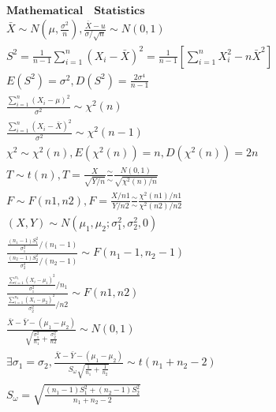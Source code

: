 \documentclass{article}
\begin{document}
\clearpage

\begin{align*}
    \mathbf{Mathematical \quad Statistics} \\ 
    \bar{X} \sim N(\mu,\frac{\sigma^2}{n}), \frac{\bar{X}-u}{\sigma/\sqrt{n}} \sim N(0,1)\\ 
    S^2 = \frac{1}{n-1}\sum_{i=1}^n(X_{i}-\bar{X})^2 = \frac{1}{n-1}[\sum_{i=1}^nX_{i}^2 - n \bar{X}^2] \\ 
    E(S^2) = \sigma^2, D(S^2) = \frac{2\sigma^4}{n-1} \\ 
    \frac{\sum_{i=1}^n(X_{i}-\mu)^2}{\sigma^2} \sim \chi^2(n) \\ 
    \frac{\sum_{i=1}^n(X_{i}-\bar{X})^2}{\sigma^2} \sim \chi^2(n-1) \\ 
    \chi^2 \sim \chi^2(n), E(\chi^2(n)) = n, D(\chi^2(n)) = 2n \\ 
    T \sim t(n), T = \frac{X}{\sqrt{Y/n}} \frac{\sim}{\sim} \frac{N(0,1)}{\sqrt{\chi^2(n)/n}}\\
    F \sim F(n1,n2), F = \frac{X/n1}{Y/n2} \frac{\sim}{\sim} \frac{\chi^2(n1)/n1}{\chi^2(n2)/n2} \\ 
    (X,Y) \sim N(\mu_{1},\mu_{2};\sigma_{1}^2,\sigma_{2}^2,0) \\ 
    \frac{\frac{(n_{1}-1)S_{1}^2}{\sigma_{1}^2}/(n_{1}-1)}{\frac{(n_{2}-1)S_{2}^2}{\sigma_{2}^2}/(n_{2}-1)} \sim F(n_{1}-1,n_{2}-1) \\
    \frac{\frac{\sum_{i=1}^{n_{1}}(X_{i}-\mu_{1})^2}{\sigma_{1}^2}/n_{1}}{\frac{\sum_{i=1}^{n_{2}}(X_{i}-\mu_{2})^2}{\sigma_{2}^2}/n2} \sim F(n1,n2) \\  
    \frac{\bar{X}-\bar{Y}-(\mu_{1}-\mu_{2})}{\sqrt{\frac{\sigma_{1}^2}{n_{1}}+\frac{\sigma_{2}^2}{n2}}} \sim N(0,1) \\ 
    \exists \sigma_{1} = \sigma_{2}, \frac{\bar{X}-\bar{Y}-(\mu_{1}-\mu_{2})}{S_{\omega}\sqrt{\frac{1}{n_{1}}+\frac{1}{n_{2}}}} \sim t(n_{1}+n_{2}-2) \\ 
    S_{\omega} = \sqrt{\frac{(n_{1}-1)S_{1}^2+(n_{2}-1)S_{2}^2 }{n_{1}+n_{2}-2}}
\end{align*}

\clearpage
\end{document}
